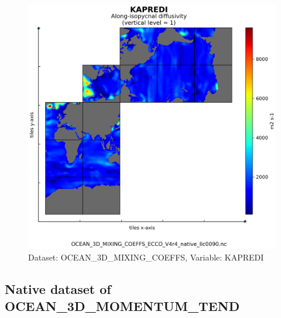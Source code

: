 \begin{figure}[H]
\centering
\includegraphics[scale=0.55]{../images/plots/native_plots/Ocean_3D_Gent-Mcwilliams_Redi_and_Background_Vertical_Diffusivity_Coefficients_for_the_Lat-Lon-Cap_90_(llc90)_Native_Model_Grid_(Version_4_Release_4)/KAPREDI.png}
\caption{Dataset: OCEAN\_3D\_MIXING\_COEFFS, Variable: KAPREDI}
\label{tab:table-OCEAN_3D_MIXING_COEFFS_KAPREDI-Plot}
\end{figure}
\newpage
\subsection{Native dataset of OCEAN\_3D\_MOMENTUM\_TEND}
\newp
